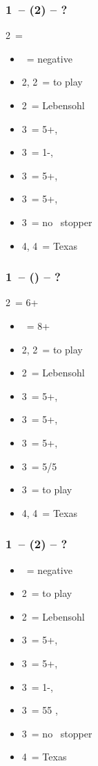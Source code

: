 \documentclass[12pt, a4paper]{article}
\begin{document}
\subsubsection*{1\ntx\ -- (2\diams) -- ?}
2\diams\ = \diams
\begin{itemize}
    \item \dbl\ = negative
    \item 2\hearts, 2\spades\ = to play
    \item 2\nt\ = Lebensohl
    \item 3\clubs\ = 5+\hearts, \invp
    \item 3\diams\ = 1-\diams, \invp
    \item 3\hearts\ = 5+\spades, \invp
    \item 3\spades\ = 5+\clubs, \gf
    \item 3\nt\ = no \diams\ stopper
    \item 4\diams, 4\hearts\ = Texas
\end{itemize}

\subsubsection*{1\ntx\ -- (\alrts{2\diams}) -- ?}
2\diams\ = 6+ \major
\begin{itemize}
    \item \dbl\ = 8+
    \item 2\hearts, 2\spades\ = to play
    \item 2\nt\ = Lebensohl
    \item 3\clubs\ = 5+\diams, \invp
    \item 3\diams\ = 5+\hearts, \invp
    \item 3\hearts\ = 5+\spades, \invp
    \item 3\spades\ = 5/5 \minor
    \item 3\nt\ = to play
    \item 4\diams, 4\hearts\ = Texas
\end{itemize}


\subsubsection*{1\ntx\ -- (2\hearts) -- ?}
\begin{itemize}
    \item \dbl\ = negative
    \item 2\spades\ = to play
    \item 2\nt\ = Lebensohl
    \item 3\clubs\ = 5+\diams, \invp
    \item 3\diams\ = 5+\spades, \invp
    \item 3\hearts\ = 1-\hearts, \gf
    \item 3\spades\ = 55 \minor, \gf
    \item 3\nt\ = no \hearts\ stopper
    \item 4\hearts\ = Texas
\end{itemize}
\end{document}
